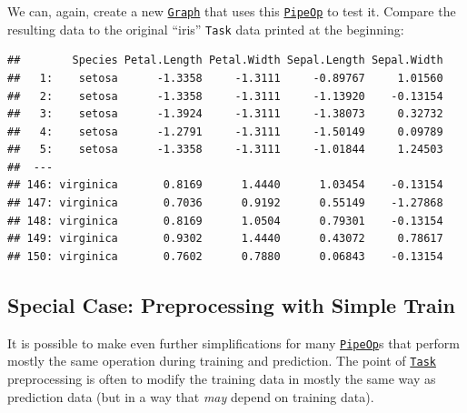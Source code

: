 \documentclass[
]{scrbook}
\newenvironment{Shaded}{\begin{snugshade}}{\end{snugshade}}
\newcommand{\DecValTok}[1]{\textcolor[rgb]{0.00,0.00,0.81}{#1}}
\newcommand{\FunctionTok}[1]{\textcolor[rgb]{0.00,0.00,0.00}{#1}}
\newcommand{\NormalTok}[1]{#1}
\newcommand{\OtherTok}[1]{\textcolor[rgb]{0.56,0.35,0.01}{#1}}
\newcommand{\SpecialCharTok}[1]{\textcolor[rgb]{0.00,0.00,0.00}{#1}}
\renewenvironment{Shaded} {\begin{snugshade}\small} {\end{snugshade}}
\begin{document}
We can, again, create a new \href{https://mlr3pipelines.mlr-org.com/reference/Graph.html}{\texttt{Graph}} that uses this \href{https://mlr3pipelines.mlr-org.com/reference/PipeOp.html}{\texttt{PipeOp}} to test it.
Compare the resulting data to the original ``iris'' \texttt{Task} data printed at the beginning:

\begin{Shaded}
\end{Shaded}

\begin{verbatim}
##        Species Petal.Length Petal.Width Sepal.Length Sepal.Width
##   1:    setosa      -1.3358     -1.3111     -0.89767     1.01560
##   2:    setosa      -1.3358     -1.3111     -1.13920    -0.13154
##   3:    setosa      -1.3924     -1.3111     -1.38073     0.32732
##   4:    setosa      -1.2791     -1.3111     -1.50149     0.09789
##   5:    setosa      -1.3358     -1.3111     -1.01844     1.24503
##  ---                                                            
## 146: virginica       0.8169      1.4440      1.03454    -0.13154
## 147: virginica       0.7036      0.9192      0.55149    -1.27868
## 148: virginica       0.8169      1.0504      0.79301    -0.13154
## 149: virginica       0.9302      1.4440      0.43072     0.78617
## 150: virginica       0.7602      0.7880      0.06843    -0.13154
\end{verbatim}

\hypertarget{special-case-preprocessing-with-simple-train}{%
\subsection{Special Case: Preprocessing with Simple Train}\label{special-case-preprocessing-with-simple-train}}

It is possible to make even further simplifications for many \href{https://mlr3pipelines.mlr-org.com/reference/PipeOp.html}{\texttt{PipeOp}}s that perform mostly the same operation during training and prediction.
The point of \href{https://mlr3.mlr-org.com/reference/Task.html}{\texttt{Task}} preprocessing is often to modify the training data in mostly the same way as prediction data (but in a way that \emph{may} depend on training data).
\end{document}

